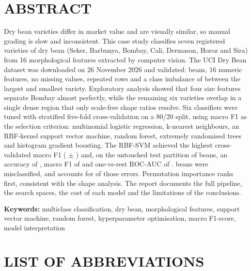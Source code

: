\chapter*{ABSTRACT}
\thispagestyle{frontmatter}

Dry bean varieties differ in market value and are visually similar, so manual
grading is slow and inconsistent. This case study classifies seven registered
varieties of dry bean (Seker, Barbunya, Bombay, Cali, Dermason, Horoz and Sira)
from 16 morphological features extracted by computer vision. The UCI Dry Bean
dataset was downloaded on 26 November 2026 and validated: \DatasetRows{} beans,
16 numeric features, no missing values, \DuplicateRows{} repeated rows and a
class imbalance of \ImbalanceRatio{} between the largest and smallest variety.
Exploratory analysis showed that four size features separate Bombay almost
perfectly, while the remaining six varieties overlap in a single dense region
that only scale-free shape ratios resolve. Six classifiers were tuned with
stratified five-fold cross-validation on a 80/20 split, using macro F1 as the
selection criterion: multinomial logistic regression, k-nearest neighbours, an
RBF-kernel support vector machine, random forest, extremely randomised trees and
histogram gradient boosting. The RBF-SVM achieved the highest cross-validated
macro F1 (\BestCV{} $\pm$ \BestCVStd{}) and, on the untouched test partition of
\TestRows{} beans, an accuracy of \BestAcc{}, macro F1 of \BestFOne{} and
one-vs-rest ROC-AUC of \BestAUC{}. \TestErrors{} beans were misclassified, and
\TopConfusion{} accounts for \TopConfusionN{} of those errors. Permutation
importance ranks \TopPermFeature{} first, consistent with the shape analysis.
The report documents the full pipeline, the search spaces, the cost of each
model and the limitations of the conclusions.

\vspace{0.5cm}
\noindent\textbf{Keywords:} multiclass classification, dry bean, morphological
features, support vector machine, random forest, hyperparameter optimisation,
macro F1-score, model interpretation

\clearpage
\tableofcontents
\clearpage
\listoffigures
{}
\clearpage
\listoftables
{}
\clearpage

\chapter*{LIST OF ABBREVIATIONS}
\thispagestyle{frontmatter}

